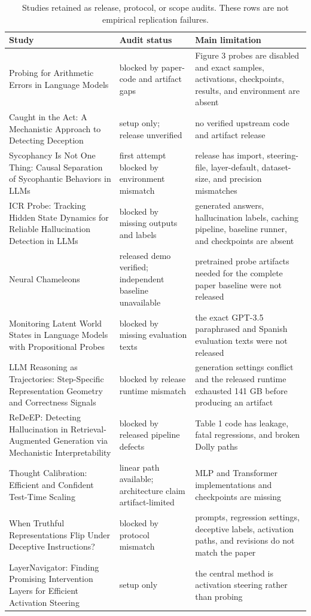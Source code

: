 \begin{table}[t]
\centering
\small
\begin{tabularx}{\textwidth}{@{}p{}p{}X@{}}
\toprule
Study & Audit status & Main limitation \\
\midrule
Probing for Arithmetic Errors in Language Models & blocked by paper-code and artifact gaps & Figure 3 probes are disabled and exact samples, activations, checkpoints, results, and environment are absent \\ 
Caught in the Act: A Mechanistic Approach to Detecting Deception & setup only; release unverified & no verified upstream code and artifact release \\ 
Sycophancy Is Not One Thing: Causal Separation of Sycophantic Behaviors in LLMs & first attempt blocked by environment mismatch & release has import, steering-file, layer-default, dataset-size, and precision mismatches \\ 
ICR Probe: Tracking Hidden State Dynamics for Reliable Hallucination Detection in LLMs & blocked by missing outputs and labels & generated answers, hallucination labels, caching pipeline, baseline runner, and checkpoints are absent \\ 
Neural Chameleons & released demo verified; independent baseline unavailable & pretrained probe artifacts needed for the complete paper baseline were not released \\ 
Monitoring Latent World States in Language Models with Propositional Probes & blocked by missing evaluation texts & the exact GPT-3.5 paraphrased and Spanish evaluation texts were not released \\ 
LLM Reasoning as Trajectories: Step-Specific Representation Geometry and Correctness Signals & blocked by release runtime mismatch & generation settings conflict and the released runtime exhausted 141 GB before producing an artifact \\ 
ReDeEP: Detecting Hallucination in Retrieval-Augmented Generation via Mechanistic Interpretability & blocked by released pipeline defects & Table 1 code has leakage, fatal regressions, and broken Dolly paths \\ 
Thought Calibration: Efficient and Confident Test-Time Scaling & linear path available; architecture claim artifact-limited & MLP and Transformer implementations and checkpoints are missing \\ 
When Truthful Representations Flip Under Deceptive Instructions? & blocked by protocol mismatch & prompts, regression settings, deceptive labels, activation paths, and revisions do not match the paper \\ 
LayerNavigator: Finding Promising Intervention Layers for Efficient Activation Steering & setup only & the central method is activation steering rather than probing \\ 
\bottomrule
\end{tabularx}
\caption{Studies retained as release, protocol, or scope audits. These rows are not empirical replication failures.}
\label{tab:artifact-audits}
\end{table}
